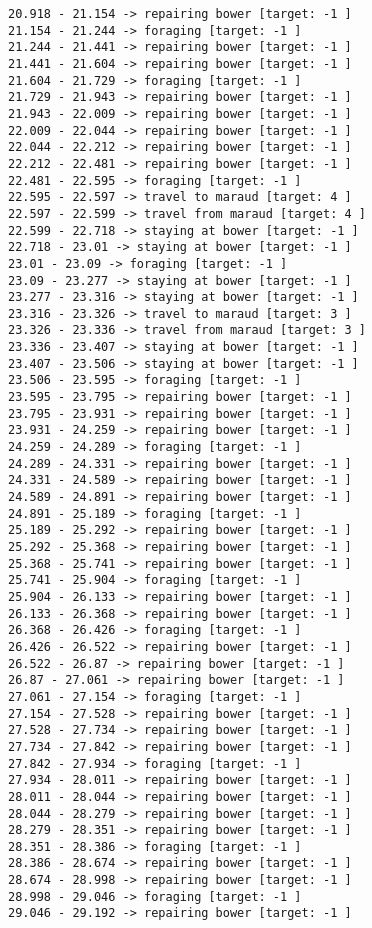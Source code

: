 \documentclass[11pt]{article}
\begin{document}
\begin{Verbatim}[commandchars=\\\{\}]
20.918 - 21.154 -> repairing bower [target: -1 ]
21.154 - 21.244 -> foraging [target: -1 ]
21.244 - 21.441 -> repairing bower [target: -1 ]
21.441 - 21.604 -> repairing bower [target: -1 ]
21.604 - 21.729 -> foraging [target: -1 ]
21.729 - 21.943 -> repairing bower [target: -1 ]
21.943 - 22.009 -> repairing bower [target: -1 ]
22.009 - 22.044 -> repairing bower [target: -1 ]
22.044 - 22.212 -> repairing bower [target: -1 ]
22.212 - 22.481 -> repairing bower [target: -1 ]
22.481 - 22.595 -> foraging [target: -1 ]
22.595 - 22.597 -> travel to maraud [target: 4 ]
22.597 - 22.599 -> travel from maraud [target: 4 ]
22.599 - 22.718 -> staying at bower [target: -1 ]
22.718 - 23.01 -> staying at bower [target: -1 ]
23.01 - 23.09 -> foraging [target: -1 ]
23.09 - 23.277 -> staying at bower [target: -1 ]
23.277 - 23.316 -> staying at bower [target: -1 ]
23.316 - 23.326 -> travel to maraud [target: 3 ]
23.326 - 23.336 -> travel from maraud [target: 3 ]
23.336 - 23.407 -> staying at bower [target: -1 ]
23.407 - 23.506 -> staying at bower [target: -1 ]
23.506 - 23.595 -> foraging [target: -1 ]
23.595 - 23.795 -> repairing bower [target: -1 ]
23.795 - 23.931 -> repairing bower [target: -1 ]
23.931 - 24.259 -> repairing bower [target: -1 ]
24.259 - 24.289 -> foraging [target: -1 ]
24.289 - 24.331 -> repairing bower [target: -1 ]
24.331 - 24.589 -> repairing bower [target: -1 ]
24.589 - 24.891 -> repairing bower [target: -1 ]
24.891 - 25.189 -> foraging [target: -1 ]
25.189 - 25.292 -> repairing bower [target: -1 ]
25.292 - 25.368 -> repairing bower [target: -1 ]
25.368 - 25.741 -> repairing bower [target: -1 ]
25.741 - 25.904 -> foraging [target: -1 ]
25.904 - 26.133 -> repairing bower [target: -1 ]
26.133 - 26.368 -> repairing bower [target: -1 ]
26.368 - 26.426 -> foraging [target: -1 ]
26.426 - 26.522 -> repairing bower [target: -1 ]
26.522 - 26.87 -> repairing bower [target: -1 ]
26.87 - 27.061 -> repairing bower [target: -1 ]
27.061 - 27.154 -> foraging [target: -1 ]
27.154 - 27.528 -> repairing bower [target: -1 ]
27.528 - 27.734 -> repairing bower [target: -1 ]
27.734 - 27.842 -> repairing bower [target: -1 ]
27.842 - 27.934 -> foraging [target: -1 ]
27.934 - 28.011 -> repairing bower [target: -1 ]
28.011 - 28.044 -> repairing bower [target: -1 ]
28.044 - 28.279 -> repairing bower [target: -1 ]
28.279 - 28.351 -> repairing bower [target: -1 ]
28.351 - 28.386 -> foraging [target: -1 ]
28.386 - 28.674 -> repairing bower [target: -1 ]
28.674 - 28.998 -> repairing bower [target: -1 ]
28.998 - 29.046 -> foraging [target: -1 ]
29.046 - 29.192 -> repairing bower [target: -1 ]

\end{Verbatim}
\end{document}
